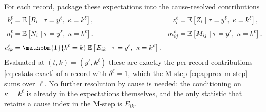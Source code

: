 \documentclass{article}
\newcommand{\ind}[1]{\mathbbm{1}\{#1\}}
\newcommand{\ex}[1]{\mathbb{E}\left[#1\right]}
\newenvironment{rcrevision}{}{}
\newcommand{\aachg}[1]{#1}
\newcommand{\subchg}[1]{#1}
\begin{document}
\begin{rcrevision}
\aachg{For each record, package these expectations into the cause-resolved contributions}
\end{rcrevision}
\begin{equation}
\label{eq:estats-exact}
\begin{aligned}
b_{i}^\ell&=\ex{B_i \mid \tau=y^\ell,\ \kappa=k^\ell},
&z_i^\ell&=\ex{Z_i \mid \tau=y^\ell,\ \kappa=k^\ell},\\[4pt]
n_{i}^\ell&=\ex{N_i \mid \tau=y^\ell,\ \kappa=k^\ell},
&m_{ij}^\ell&=\ex{M_{ij} \mid \tau=y^\ell,\ \kappa=k^\ell},\\[4pt]
e_{ik}^\ell&=\ind{k^\ell=k}\,\ex{E_{ik} \mid \tau=y^\ell,\ \kappa=k^\ell}. &&
\end{aligned}
\end{equation}
\subchg{Evaluated at $(t,k)=(y^\ell,k^\ell)$ these are exactly the per-record contributions
\eqref{eq:estats-exact} of a record with $\delta^\ell=1$, which the M-step \eqref{eq:approx-m-step}
sums over $\ell$. No further resolution by cause is needed: the conditioning on $\kappa=k^\ell$ is
already in the expectations themselves, and the only statistic that retains a cause index in the
M-step is $E_{ik}$.}
\end{document}
